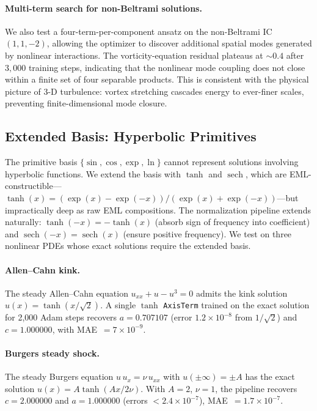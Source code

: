 \paragraph{Multi-term search for non-Beltrami solutions.}
We also test a four-term-per-component ansatz on the non-Beltrami IC
$(1,1,-2)$, allowing the optimizer to discover additional spatial modes
generated by nonlinear interactions.  The vorticity-equation residual
plateaus at $\sim\!0.4$ after $3{,}000$ training steps, indicating that
the nonlinear mode coupling does not close within a finite set of four
separable products.  This is consistent with the physical picture of 3-D
turbulence: vortex stretching cascades energy to ever-finer scales,
preventing finite-dimensional mode closure.

\subsection{Extended Basis: Hyperbolic Primitives}
\label{sec:hyperbolic}

The primitive basis $\{\sin, \cos, \exp, \ln\}$ cannot represent solutions
involving hyperbolic functions.  We extend the basis with $\tanh$ and
$\operatorname{sech}$, which are EML-constructible---$\tanh(x) = (\exp(x) -
\exp(-x))/(\exp(x) + \exp(-x))$---but impractically deep as raw EML
compositions.  The normalization pipeline extends naturally: $\tanh(-x) =
-\tanh(x)$ (absorb sign of frequency into coefficient) and
$\operatorname{sech}(-x) = \operatorname{sech}(x)$ (ensure positive
frequency).  We test on three nonlinear PDEs whose exact solutions require
the extended basis.

\paragraph{Allen--Cahn kink.}
The steady Allen--Cahn equation $u_{xx} + u - u^{3} = 0$ admits the kink
solution $u(x) = \tanh(x/\sqrt{2})$.  A single $\tanh$ \texttt{AxisTerm}
trained on the exact solution for 2{,}000 Adam steps recovers
$a = 0.707107$ (error $1.2\!\times\!10^{-8}$ from $1/\sqrt{2}$) and
$c = 1.000000$, with MAE~$= 7\!\times\!10^{-9}$.

\paragraph{Burgers steady shock.}
The steady Burgers equation $u\,u_{x} = \nu\,u_{xx}$ with
$u(\pm\infty) = \pm A$ has the exact solution
$u(x) = A\tanh(Ax/2\nu)$.  With $A=2$, $\nu=1$, the pipeline recovers
$c = 2.000000$ and $a = 1.000000$ (errors $< 2.4\!\times\!10^{-7}$),
MAE~$= 1.7\!\times\!10^{-7}$.

